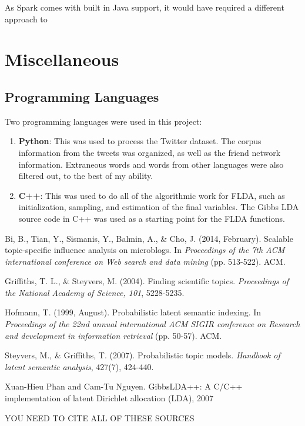 \documentclass[a4paper]{article}
\begin{document}
As Spark comes with built in Java support, it would have required a different approach to 

\section{Miscellaneous}
\label{sec:misc}
\subsection{Programming Languages}
Two programming languages were used in this project:
\begin{enumerate}
\item \textbf{Python}: This was used to process the Twitter dataset. The corpus information from the tweets was organized, as well as the friend network information. Extraneous words and words from other languages were also filtered out, to the best of my ability.
\item \textbf{C++}: This was used to do all of the algorithmic work for FLDA, such as initialization, sampling, and estimation of the final variables. The Gibbs LDA source code in C++ was used as a starting point for the FLDA functions.
\end{enumerate}


\begin{thebibliography}{9}
Bi, B., Tian, Y., Sismanis, Y., Balmin, A., \& Cho, J. (2014, February). Scalable topic-specific influence analysis on microblogs. In \textit{Proceedings of the 7th ACM international conference on Web search and data mining} (pp. 513-522). ACM.

Griffiths, T. L., \& Steyvers, M. (2004). Finding scientific topics. \textit{Proceedings of the National Academy of Science, 101}, 5228-5235.

Hofmann, T. (1999, August). Probabilistic latent semantic indexing. In \textit{Proceedings of the 22nd annual international ACM SIGIR conference on Research and development in information retrieval} (pp. 50-57). ACM.

Steyvers, M., \& Griffiths, T. (2007). Probabilistic topic models. \textit{Handbook of latent semantic analysis}, 427(7), 424-440.

Xuan-Hieu Phan and Cam-Tu Nguyen. GibbsLDA++: A C/C++ implementation of latent Dirichlet allocation (LDA), 2007

YOU NEED TO CITE ALL OF THESE SOURCES

\end{thebibliography}
\end{document}
